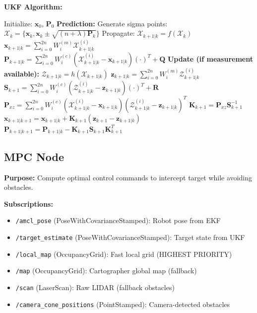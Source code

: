 \documentclass[11pt]{article}
\begin{document}
\textbf{UKF Algorithm:}

\begin{algorithm}[H]
\caption{Unscented Kalman Filter}
\begin{algorithmic}[1]
\State Initialize: $\mathbf{x}_0$, $\mathbf{P}_0$
    \State \textbf{Prediction:}
    \State Generate sigma points: $\mathcal{X}_k = \{\mathbf{x}_k, \mathbf{x}_k \pm \sqrt{(n+\lambda)\mathbf{P}_k}\}$
    \State Propagate: $\mathcal{X}_{k+1|k} = f(\mathcal{X}_k)$
    \State $\mathbf{x}_{k+1|k} = \sum_{i=0}^{2n} W_i^{(m)} \mathcal{X}_{k+1|k}^{(i)}$
    \State $\mathbf{P}_{k+1|k} = \sum_{i=0}^{2n} W_i^{(c)} (\mathcal{X}_{k+1|k}^{(i)} - \mathbf{x}_{k+1|k})(\cdot)^T + \mathbf{Q}$
    \State \textbf{Update (if measurement available):}
    \State $\mathcal{Z}_{k+1|k} = h(\mathcal{X}_{k+1|k})$
    \State $\mathbf{z}_{k+1|k} = \sum_{i=0}^{2n} W_i^{(m)} \mathcal{Z}_{k+1|k}^{(i)}$
    \State $\mathbf{S}_{k+1} = \sum_{i=0}^{2n} W_i^{(c)} (\mathcal{Z}_{k+1|k}^{(i)} - \mathbf{z}_{k+1|k})(\cdot)^T + \mathbf{R}$
    \State $\mathbf{P}_{xz} = \sum_{i=0}^{2n} W_i^{(c)} (\mathcal{X}_{k+1|k}^{(i)} - \mathbf{x}_{k+1|k})(\mathcal{Z}_{k+1|k}^{(i)} - \mathbf{z}_{k+1|k})^T$
    \State $\mathbf{K}_{k+1} = \mathbf{P}_{xz} \mathbf{S}_{k+1}^{-1}$
    \State $\mathbf{x}_{k+1|k+1} = \mathbf{x}_{k+1|k} + \mathbf{K}_{k+1}(\mathbf{z}_{k+1} - \mathbf{z}_{k+1|k})$
    \State $\mathbf{P}_{k+1|k+1} = \mathbf{P}_{k+1|k} - \mathbf{K}_{k+1} \mathbf{S}_{k+1} \mathbf{K}_{k+1}^T$
\EndLoop
\end{algorithmic}
\end{algorithm}

\subsection{MPC Node}

\textbf{Purpose:} Compute optimal control commands to intercept target while avoiding obstacles.

\textbf{Subscriptions:}
\begin{itemize}
    \item \texttt{/amcl\_pose} (PoseWithCovarianceStamped): Robot pose from EKF
    \item \texttt{/target\_estimate} (PoseWithCovarianceStamped): Target state from UKF
    \item \texttt{/local\_map} (OccupancyGrid): Fast local grid (HIGHEST PRIORITY)
    \item \texttt{/map} (OccupancyGrid): Cartographer global map (fallback)
    \item \texttt{/scan} (LaserScan): Raw LIDAR (fallback obstacles)
    \item \texttt{/camera\_cone\_positions} (PointStamped): Camera-detected obstacles
\end{itemize}
\end{document}
